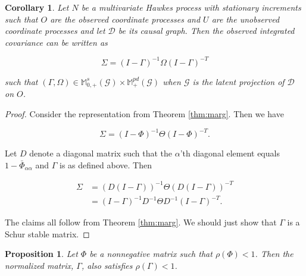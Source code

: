 \documentclass[accepted]{uai2021} %
\newtheorem{cor}[thm]{Corollary}
\newtheorem{prop}[thm]{Proposition}
\begin{document}
\begin{cor}
	Let $N$ be a multivariate Hawkes process with stationary increments such 
	that $O$ are the 
	observed 
	coordinate processes and $U$ are the unobserved coordinate processes and 
	let $\mathcal{D}$ be its causal graph. Then the observed integrated 
	covariance can be written as
	
	$$
	\Sigma = (I - \Gamma)^{-1}\Omega (I - \Gamma)^{-T}
	$$
	
	\noindent such that $(\Gamma, \Omega) \in \mathbb{M}_{0,+}^s(\mathcal{G}) 
	\times 
	\mathbb{M}_+^{pd}(\mathcal{G})$ when $\mathcal{G}$ is the latent projection 
	of $\mathcal{D}$ on $O$.
	
	\label{cor:normEq}
\end{cor}

\begin{proof}
	Consider the representation from Theorem \ref{thm:marg}. Then we have 
	
	$$
	\Sigma= (I - \Phi)^{-1} \Theta (I - \Phi)^{-T}.
	$$ 
	
	Let $D$ denote a 
	diagonal matrix such that the $\alpha$'th diagonal element equals 
	$1 - \bar{\Phi}_{\alpha\alpha}$ and $\Gamma$ is as defined above. Then
	
	
	\begin{align}
	\Sigma 
	& = (D(I - \Gamma))^{-1}\Theta (D(I - \Gamma))^{-T} \nonumber \\
	& = (I - \Gamma)^{-1}D^{-1}\Theta D^{-1}(I - 
	\Gamma)^{-T}.
	\label{eq:Gtilde}
	\end{align}
	
	The claims all follow from Theorem \ref{thm:marg}. We should just show that 
	$\Gamma$ is a Schur stable matrix.
\end{proof}

\begin{prop}
	Let $\Phi$ be a nonnegative matrix such that $\rho(\Phi) < 1$. Then the 
	normalized matrix, $\Gamma$, also satisfies $\rho(\Gamma) < 1$. 
\end{prop}
\end{document}
